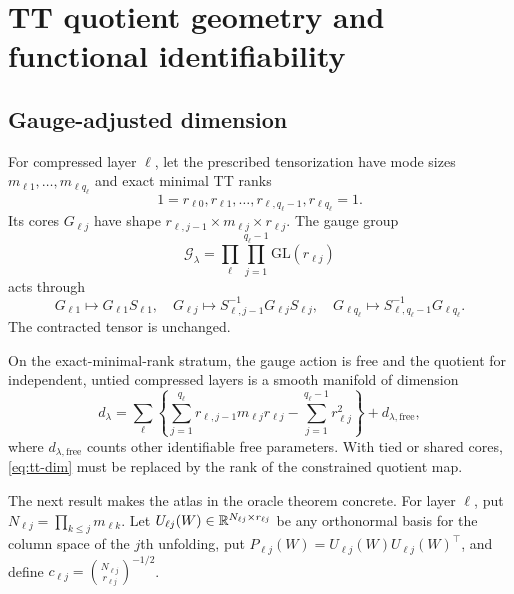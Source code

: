 \section{TT quotient geometry and functional identifiability}
\label{sec:geometry}

\subsection{Gauge-adjusted dimension}

For compressed layer \(\ell\), let the prescribed tensorization have mode sizes \(m_{\ell1},\ldots,m_{\ell q_\ell}\) and exact minimal TT ranks
\[
1=r_{\ell0},r_{\ell1},\ldots,r_{\ell,q_\ell-1},r_{\ell q_\ell}=1.
\]
Its cores \(G_{\ell j}\) have shape
\(r_{\ell,j-1}\times m_{\ell j}\times r_{\ell j}\). The gauge group
\[
\mathcal G_\lambda=
\prod_\ell\prod_{j=1}^{q_\ell-1}\mathrm{GL}(r_{\ell j})
\]
acts through
\[
G_{\ell1}\mapsto G_{\ell1}S_{\ell1},\quad
G_{\ell j}\mapsto S_{\ell,j-1}^{-1}G_{\ell j}S_{\ell j},\quad
G_{\ell q_\ell}\mapsto S_{\ell,q_\ell-1}^{-1}G_{\ell q_\ell}.
\]
The contracted tensor is unchanged.

\begin{lemma}
\label{lem:tt-dimension}
On the exact-minimal-rank stratum, the gauge action is free and the quotient for independent, untied compressed layers is a smooth manifold of dimension
\begin{equation}
d_\lambda=
\sum_\ell\left\{
\sum_{j=1}^{q_\ell}r_{\ell,j-1}m_{\ell j}r_{\ell j}
-\sum_{j=1}^{q_\ell-1}r_{\ell j}^2
\right\}+d_{\lambda,\mathrm{free}},
\label{eq:tt-dim}
\end{equation}
where \(d_{\lambda,\mathrm{free}}\) counts other identifiable free parameters. With tied or shared cores, \cref{eq:tt-dim} must be replaced by the rank of the constrained quotient map.
\end{lemma}

The next result makes the atlas in the oracle theorem concrete. For layer
\(\ell\), put \(N_{\ell j}=\prod_{k\le j}m_{\ell k}\). Let
\(U_{\ell j}(W)\in\mathbb R^{N_{\ell j}\times r_{\ell j}}\) be any orthonormal
basis for the column space of the \(j\)th unfolding, put
\(P_{\ell j}(W)=U_{\ell j}(W)U_{\ell j}(W)^\top\), and define
\(c_{\ell j}=\binom{N_{\ell j}}{r_{\ell j}}^{-1/2}\).

